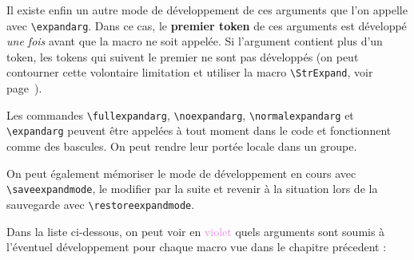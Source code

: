\documentclass[a4paper,10pt,french]{article}
\newcommand\verbinline{\lstinline[basicstyle=\normalsize\ttfamily]}
\begin{document}
Il existe enfin un autre mode de développement de ces arguments que l'on appelle avec \verbinline|\expandarg|. Dans ce cas, le \textbf{premier token} de ces arguments est développé \emph{une fois} avant que la macro ne soit appelée. Si l'argument contient plus d'un token, les tokens qui suivent le premier ne sont pas développés (on peut contourner cette volontaire limitation et utiliser la macro \verbinline|\StrExpand|, voir page~\pageref{scancs}).\medskip

Les commandes \verbinline|\fullexpandarg|, \verbinline|\noexpandarg|, \verbinline|\normalexpandarg| et \verbinline|\expandarg| peuvent être appelées à tout moment dans le code et fonctionnent comme des bascules. On peut rendre leur portée locale dans un groupe.\medskip

On peut également mémoriser le mode de développement en cours avec \verbinline|\saveexpandmode|, le modifier par la suite et revenir à la situation lors de la sauvegarde avec \verbinline|\restoreexpandmode|.\medskip

Dans la liste ci-dessous, on peut voir en \textcolor{violet}{violet} quels arguments sont soumis à l'éventuel développement pour chaque macro vue dans le chapitre précedent :
\end{document}
